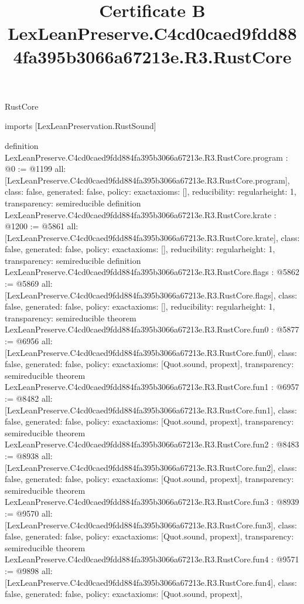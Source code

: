 \begin{lexlean}{RustCore}
\title{Certificate B LexLeanPreserve.C4cd0caed9fdd884fa395b3066a67213e.R3.RustCore}
\begin{coremodule}
imports [LexLeanPreservation.RustSound]

definition LexLeanPreserve.C4cd0caed9fdd884fa395b3066a67213e.R3.RustCore.program : @0 := @1199 {
  all: [LexLeanPreserve.C4cd0caed9fdd884fa395b3066a67213e.R3.RustCore.program],
  class: false,
  generated: false,
  policy: exact{axioms: []},
  reducibility: regular{height: 1},
  transparency: semireducible
}
definition LexLeanPreserve.C4cd0caed9fdd884fa395b3066a67213e.R3.RustCore.krate : @1200 := @5861 {
  all: [LexLeanPreserve.C4cd0caed9fdd884fa395b3066a67213e.R3.RustCore.krate],
  class: false,
  generated: false,
  policy: exact{axioms: []},
  reducibility: regular{height: 1},
  transparency: semireducible
}
definition LexLeanPreserve.C4cd0caed9fdd884fa395b3066a67213e.R3.RustCore.flags : @5862 := @5869 {
  all: [LexLeanPreserve.C4cd0caed9fdd884fa395b3066a67213e.R3.RustCore.flags],
  class: false,
  generated: false,
  policy: exact{axioms: []},
  reducibility: regular{height: 1},
  transparency: semireducible
}
theorem LexLeanPreserve.C4cd0caed9fdd884fa395b3066a67213e.R3.RustCore.fun0 : @5877 := @6956 {
  all: [LexLeanPreserve.C4cd0caed9fdd884fa395b3066a67213e.R3.RustCore.fun0],
  class: false,
  generated: false,
  policy: exact{axioms: [Quot.sound, propext]},
  transparency: semireducible
}
theorem LexLeanPreserve.C4cd0caed9fdd884fa395b3066a67213e.R3.RustCore.fun1 : @6957 := @8482 {
  all: [LexLeanPreserve.C4cd0caed9fdd884fa395b3066a67213e.R3.RustCore.fun1],
  class: false,
  generated: false,
  policy: exact{axioms: [Quot.sound, propext]},
  transparency: semireducible
}
theorem LexLeanPreserve.C4cd0caed9fdd884fa395b3066a67213e.R3.RustCore.fun2 : @8483 := @8938 {
  all: [LexLeanPreserve.C4cd0caed9fdd884fa395b3066a67213e.R3.RustCore.fun2],
  class: false,
  generated: false,
  policy: exact{axioms: [Quot.sound, propext]},
  transparency: semireducible
}
theorem LexLeanPreserve.C4cd0caed9fdd884fa395b3066a67213e.R3.RustCore.fun3 : @8939 := @9570 {
  all: [LexLeanPreserve.C4cd0caed9fdd884fa395b3066a67213e.R3.RustCore.fun3],
  class: false,
  generated: false,
  policy: exact{axioms: [Quot.sound, propext]},
  transparency: semireducible
}
theorem LexLeanPreserve.C4cd0caed9fdd884fa395b3066a67213e.R3.RustCore.fun4 : @9571 := @9898 {
  all: [LexLeanPreserve.C4cd0caed9fdd884fa395b3066a67213e.R3.RustCore.fun4],
  class: false,
  generated: false,
  policy: exact{axioms: [Quot.sound, propext]},
}
\end{coremodule}
\end{lexlean}
